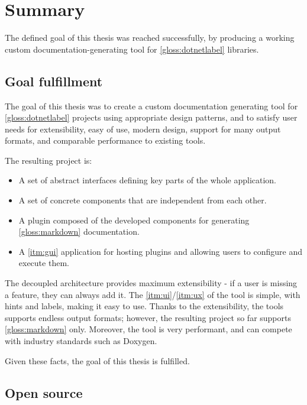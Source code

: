 \chapter*{Summary}

The defined goal of this thesis was reached successfully, by producing a working custom documentation-generating tool for \ref{gloss:dotnetlabel} libraries.

\section*{Goal fulfillment}

The goal of this thesis was to create a custom documentation generating tool for \ref{gloss:dotnetlabel} projects using appropriate design patterns, and to satisfy user needs for extensibility, easy of use, modern design, support for many output formats, and comparable performance to existing tools.

The resulting project is:
\begin{itemize}
    \item A set of abstract interfaces defining key parts of the whole application.
    \item A set of concrete components that are independent from each other.
    \item A plugin composed of the developed components for generating \ref{gloss:markdown} documentation.
    \item A \ref{itm:gui} application for hosting plugins and allowing users to configure and execute them.
\end{itemize}

The decoupled architecture provides maximum extensibility - if a user is missing a feature, they can always add it. The \ref{itm:ui}/\ref{itm:ux} of the tool is simple, with hints and labels, making it easy to use. Thanks to the extensibility, the tools supports endless output formats; however, the resulting project so far supports \ref{gloss:markdown} only. Moreover, the tool is very performant, and can compete with industry standards such as Doxygen.

Given these facts, the goal of this thesis is fulfilled.

\section*{Open source} \label{sec:openSource}

